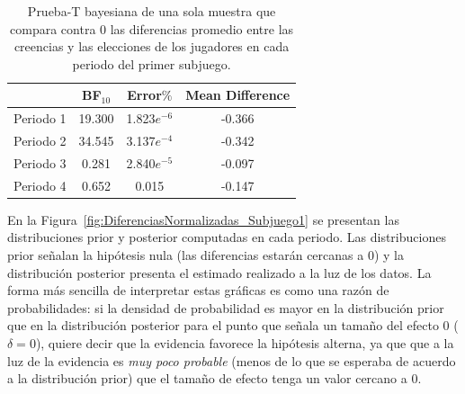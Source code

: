 \begin{table}
\caption[Diferencias Normalizadas en el Subjuego 1]{Prueba-T bayesiana de una sola muestra que compara contra 0 las diferencias promedio entre las creencias y las elecciones de los jugadores en cada periodo del primer subjuego.}
\label{DN_Sub1}
\centering
\begin{tabular}{l | c c c}  %
\toprule
\textbf{} & \textbf{BF$_{10}$} & \textbf{Error$\%$} & \textbf{Mean Difference}\\
\midrule
Periodo 1 & 19.300 & 1.823$e^{-6}$ & -0.366 \\
Periodo 2 & 34.545 & 3.137$e^{-4}$ & -0.342 \\
Periodo 3 & 0.281 & 2.840$e^{-5}$ & -0.097 \\
Periodo 4 & 0.652 & 0.015 & -0.147 \\
\bottomrule
\end{tabular}
\end{table}

En la Figura~\ref{fig:DiferenciasNormalizadas_Subjuego1} se presentan las distribuciones prior y posterior computadas en cada periodo. Las distribuciones prior señalan la hipótesis nula (las diferencias estarán cercanas a $0$) y la distribución posterior presenta el estimado realizado a la luz de los datos. La forma más sencilla de interpretar estas gráficas es como una razón de probabilidades: si la densidad de probabilidad es mayor en la distribución prior que en la distribución posterior para el punto que señala un tamaño del efecto $0$ ($\delta = 0$), quiere decir que la evidencia favorece la hipótesis alterna, ya que que a la luz de la evidencia es \textit{muy poco probable} (menos de lo que se esperaba de acuerdo a la distribución prior) que el tamaño de efecto tenga un valor cercano a $0$.\\


